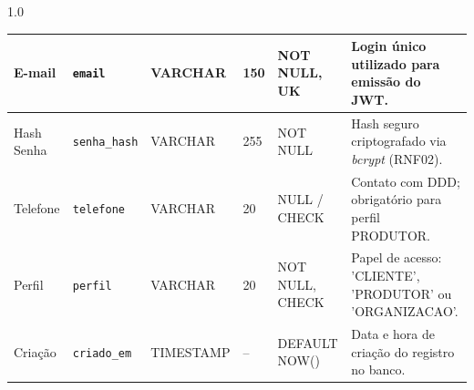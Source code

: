 \documentclass[12pt,a4paper]{article}
\begin{document}
\begin{spacing}{1.0}
\begin{tabularx}{\textwidth}{|p{1.6cm}|p{1.9cm}|p{1.2cm}|p{0.7cm}|p{1.9cm}|X|}
E-mail & \texttt{email} & VARCHAR & 150 & NOT NULL, UK & Login único utilizado para emissão do JWT. \\ \hline

Hash Senha & \texttt{senha\_hash} & VARCHAR & 255 & NOT NULL & Hash seguro criptografado via \textit{bcrypt} (RNF02). \\ \hline

Telefone & \texttt{telefone} & VARCHAR & 20 & NULL / CHECK & Contato com DDD; obrigatório para perfil PRODUTOR. \\ \hline

Perfil & \texttt{perfil} & VARCHAR & 20 & NOT NULL, CHECK & Papel de acesso: 'CLIENTE', 'PRODUTOR' ou 'ORGANIZACAO'. \\ \hline

Criação & \texttt{criado\_em} & TIMESTAMP & -- & DEFAULT NOW() & Data e hora de criação do registro no banco. \\ \hline

\end{tabularx}

\end{spacing}

\newpage

\end{document}
